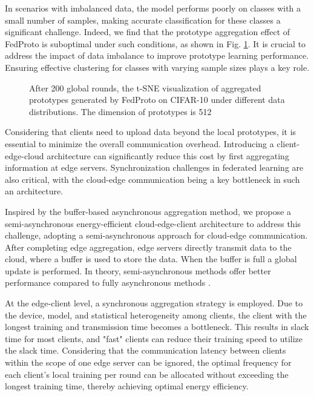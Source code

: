 \documentclass[journal]{IEEEtran}
\begin{document}
In scenarios with imbalanced data, the model performs poorly on classes with a small number of samples, making accurate classification for these classes a significant challenge. Indeed, we find that the prototype aggregation effect of FedProto\cite{tan_fedproto_2021} is suboptimal under such conditions, as shown in Fig. \ref{motivation_tsne}. It is crucial to address the impact of data imbalance to improve prototype learning performance. Ensuring effective clustering for classes with varying sample sizes plays a key role.

\begin{figure}[H]
    \centering
    \hfill

    \caption{After 200 global rounds, the t-SNE visualization of aggregated prototypes generated by FedProto on CIFAR-10 under different data distributions. The dimension of prototypes is 512}
    \label{motivation_tsne}
\end{figure}
Considering that clients need to upload data beyond the local prototypes, it is essential to minimize the overall communication overhead. Introducing a client-edge-cloud architecture \cite{liu_client-edge-cloud_2020,liu_hierarchical_2023} can significantly reduce this cost by first aggregating information at edge servers. Synchronization challenges in federated learning are also critical, with the cloud-edge communication being a key bottleneck in such an architecture. 

Inspired by the buffer-based asynchronous aggregation method\cite{nguyen_federated_2022}, we propose a semi-asynchronous energy-efficient cloud-edge-client architecture to address this challenge, adopting a semi-asynchronous approach for cloud-edge communication. After completing edge aggregation, edge servers directly transmit data to the cloud, where a buffer is used to store the data. When the buffer is full a global update is performed. In theory, semi-asynchronous methods offer better performance compared to fully asynchronous methods \cite{nguyen_federated_2022}.

At the edge-client level, a synchronous aggregation strategy is employed. Due to the device, model, and statistical heterogeneity among clients, the client with the longest training and transmission time becomes a bottleneck. This results in slack time for most clients, and "fast" clients can reduce their training speed to utilize the slack time. Considering that the communication latency between clients within the scope of one edge server can be ignored, the optimal frequency for each client's local training per round can be allocated without exceeding the longest training time, thereby achieving optimal energy efficiency. 
\end{document}
